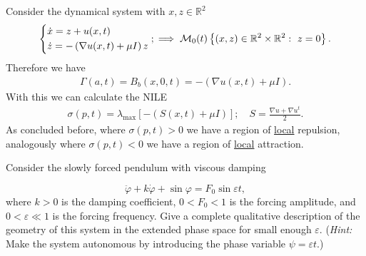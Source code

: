 \begin{ex}
	Consider the dynamical system with $x,z\in \mathbb{R}^{2}$
	\begin{align}
		\begin{dcases}
			\dot{x} = z + u(x,t) \\
			\dot{z} = - \left( \nabla u(x,t) + \mu I \right) z
		\end{dcases}
		; \implies \mathcal{M}_{0}(t) \left\{ (x,z) \in \mathbb{R}^{2}\times \mathbb{R}^{2}:\ z =0\right\}.	
	\end{align}
Therefore we have 
\begin{align}
	\Gamma(a,t) = B_{b}(x,0,t) = - \left(\nabla u(x,t) + \mu I \right).
\end{align}
With this we can calculate the NILE
\begin{align}
	\sigma(p,t) = \lambda _{ \textrm{max} } \left[ - (S(x,t) + \mu I ) \right]; \quad S = \frac{\nabla u + \nabla u^{t}}{2}.
\end{align}
As concluded before, where $\sigma(p,t)>0$ we have a region of \underline{local} repulsion, analogously where $\sigma(p,t) <0$ we have a region of \underline{local} attraction.
\end{ex}

\begin{exercise}
Consider the slowly forced pendulum with viscous damping

\begin{equation*}
    \label{eq1}\ddot{\varphi} + k\dot{\varphi} + \sin \varphi = F_0 \sin \varepsilon t,
\end{equation*}
where $k>0$ is the damping coefficient, $0<F_0<1$ is the forcing amplitude, and $0<\varepsilon \ll 1$ is the forcing frequency. Give a complete qualitative description of the geometry of this system in the extended phase space for small enough $\varepsilon$. ({\em Hint:} Make the system autonomous by introducing the phase variable $\psi = \varepsilon t$.)
\end{exercise}

